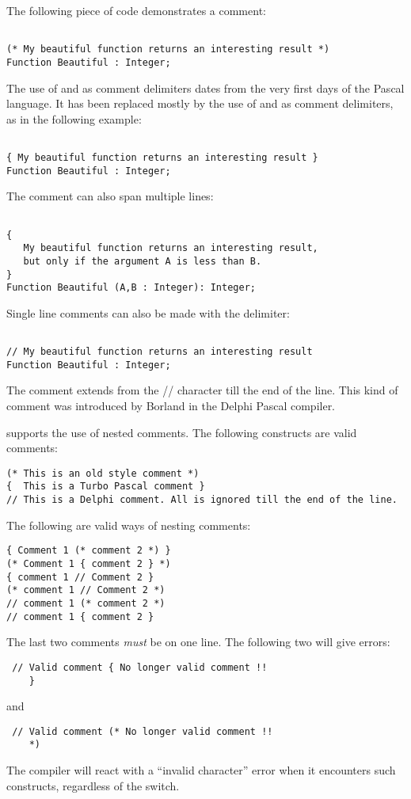 The following piece of code demonstrates a comment:
\begin{verbatim}

(* My beautiful function returns an interesting result *)
Function Beautiful : Integer;

\end{verbatim}
The use of \var{(*} and \var{*)} as comment delimiters dates from the very
first days of the Pascal language. It has been replaced mostly by the
use of \var{\{} and \var{\}} as comment delimiters, as in the following
example:
\begin{verbatim}

{ My beautiful function returns an interesting result }
Function Beautiful : Integer;

\end{verbatim}
The comment can also span multiple lines:
\begin{verbatim}

{
   My beautiful function returns an interesting result,
   but only if the argument A is less than B.
}
Function Beautiful (A,B : Integer): Integer;
\end{verbatim}
Single line comments can also be made with the \var{//} delimiter:
\begin{verbatim}

// My beautiful function returns an interesting result
Function Beautiful : Integer;

\end{verbatim}
The comment extends from the // character till the end of the line.
This kind of comment was introduced by Borland in the Delphi Pascal
compiler.

\fpc supports the use of nested comments. The following constructs are valid
comments:
\begin{verbatim}
(* This is an old style comment *)
{  This is a Turbo Pascal comment }
// This is a Delphi comment. All is ignored till the end of the line.
\end{verbatim}
The following are valid ways of nesting comments:
\begin{verbatim}
{ Comment 1 (* comment 2 *) }
(* Comment 1 { comment 2 } *)
{ comment 1 // Comment 2 }
(* comment 1 // Comment 2 *)
// comment 1 (* comment 2 *)
// comment 1 { comment 2 }
\end{verbatim}
The last two comments {\em must} be on one line. The following two will give
errors:
\begin{verbatim}
 // Valid comment { No longer valid comment !!
    }
\end{verbatim}
and
\begin{verbatim}
 // Valid comment (* No longer valid comment !!
    *)
\end{verbatim}
The compiler will react with a ``invalid character'' error when it encounters
such constructs, regardless of the  switch.

